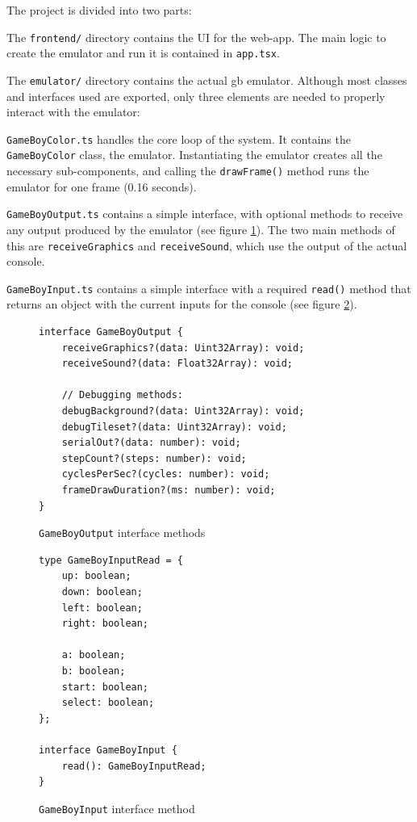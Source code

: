 \documentclass[11pt]{report}
\begin{document}
The project is divided into two parts:
\begin{compactitem}
    \item The \texttt{frontend/} directory contains the UI for the web-app. The main logic to create the emulator and run it is contained in \texttt{app.tsx}.
    \item  The \texttt{emulator/} directory contains the actual \gls{gb} emulator. Although most classes and interfaces used are exported, only three elements are needed to properly interact with the emulator:
    \begin{compactitem}
        \item \texttt{GameBoyColor.ts} handles the core loop of the system. It contains the \texttt{GameBoyColor} class, the emulator. Instantiating the emulator creates all the necessary sub-components, and calling the \texttt{drawFrame()} method runs the emulator for one frame (0.16 seconds).
        \item \texttt{GameBoyOutput.ts} contains a simple interface, with optional methods to receive any output produced by the emulator (see figure \ref{fig:gameboyoutput}). The two main methods of this are \texttt{receiveGraphics} and \texttt{receiveSound}, which use the output of the actual console.
        \item \texttt{GameBoyInput.ts} contains a simple interface with a required \texttt{read()} method that returns an object with the current inputs for the console (see figure \ref{fig:gameboyinput}).
    \end{compactitem}
\end{compactitem}

\begin{figure}[h]
    \begin{verbatim}
interface GameBoyOutput {
    receiveGraphics?(data: Uint32Array): void;
    receiveSound?(data: Float32Array): void;

    // Debugging methods:
    debugBackground?(data: Uint32Array): void;
    debugTileset?(data: Uint32Array): void;
    serialOut?(data: number): void;
    stepCount?(steps: number): void;
    cyclesPerSec?(cycles: number): void;
    frameDrawDuration?(ms: number): void;
}
    \end{verbatim}
    \caption{\texttt{GameBoyOutput} interface methods}
    \label{fig:gameboyoutput}
\end{figure}

\begin{figure}[h]
    \begin{verbatim}
type GameBoyInputRead = {
    up: boolean;
    down: boolean;
    left: boolean;
    right: boolean;

    a: boolean;
    b: boolean;
    start: boolean;
    select: boolean;
};

interface GameBoyInput {
    read(): GameBoyInputRead;
}
    \end{verbatim}
    \caption{\texttt{GameBoyInput} interface method}
    \label{fig:gameboyinput}
\end{figure}
\end{document}
